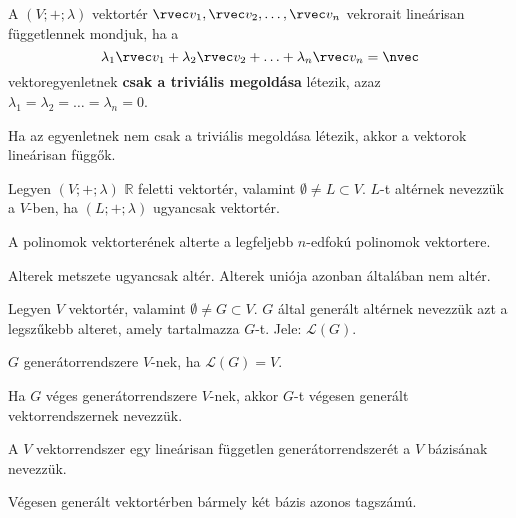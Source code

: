 \begin{definition}
  A $(V; +; \lambda)$ vektortér $\rvec v_1, \rvec v_2, \ldots, \rvec v_n$
  vekrorait lineárisan függetlennek mondjuk, ha a
  $$
    \lambda_1 \rvec v_1
    + \lambda_2 \rvec v_2
    + \ldots
    + \lambda_n \rvec v_n
    = \nvec
  $$
  vektoregyenletnek \textbf{csak a triviális megoldása} létezik, azaz
  $\lambda_1 = \lambda_2 = \ldots = \lambda_n = 0$.

  Ha az egyenletnek nem csak a triviális megoldása létezik, akkor a vektorok
  lineárisan függők.
\end{definition}

\begin{definition}[Altér]
  Legyen $(V; +; \lambda)$ $\mathbb R$ feletti vektortér, valamint
  $\emptyset \neq L \subset V$. $L$-t altérnek nevezzük a $V$-ben, ha
  $(L; +; \lambda)$ ugyancsak vektortér.
\end{definition}

\begin{example}
  A polinomok vektorterének alterte a legfeljebb $n$-edfokú polinomok
  vektortere.
\end{example}

\begin{statement}
  Alterek metszete ugyancsak altér. Alterek uniója azonban általában nem altér.
\end{statement}

\begin{definition}[Generátorrendszer]
  Legyen $V$ vektortér, valamint $\emptyset \neq G \subset V$. $G$ által
  generált altérnek nevezzük azt a legszűkebb alteret, amely tartalmazza $G$-t.
  Jele: $\mathcal L(G)$.

  $G$ generátorrendszere $V$-nek, ha $\mathcal L(G) = V$.
\end{definition}

\begin{note}
  Ha $G$ véges generátorrendszere $V$-nek, akkor $G$-t végesen generált
  vektorrendszernek nevezzük.
\end{note}

\begin{definition}[Bázis]
  A $V$ vektorrendszer egy lineárisan független generátorrendszerét a $V$
  bázisának nevezzük.
\end{definition}

\begin{statement}
  Végesen generált vektortérben bármely két bázis azonos tagszámú.
\end{statement}

